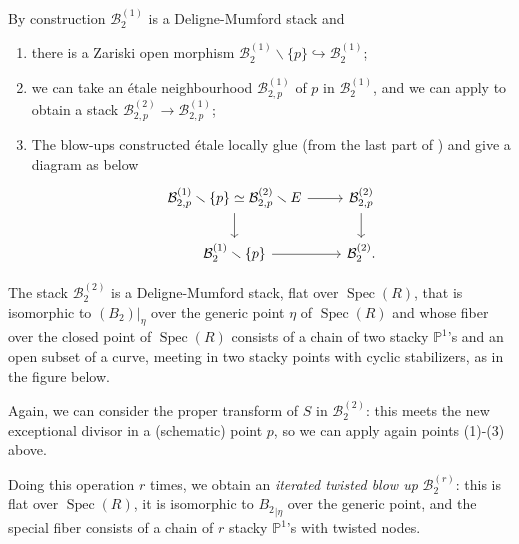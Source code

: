 \documentclass{amsart}
\newcommand{\bP}{\mathbb{P}}
\newcommand{\cB}{\mathcal{B}}
\newcommand{\spec}{\operatorname{Spec}}
\theoremstyle{definition}
\begin{document}
By construction $\cB_2^{(1)}$ is a Deligne-Mumford stack and
\begin{enumerate}
    \item there is a Zariski open morphism $\cB_2^{(1)}\smallsetminus\{p\}\hookrightarrow \cB_2^{(1)}$;
    \item we can take an \'etale neighbourhood $\cB_{2,p}^{(1)}$ of $p$ in $\cB_2^{(1)}$, and we can apply  to obtain a stack $\cB_{2,p}^{(2)}\to\cB_{2,p}^{(1)}$;
    \item The blow-ups constructed \'etale locally glue (from the last part of ) and give a diagram as below
    \[
    \begin{tikzcd}
    \cB^{(1)}_{2,p} \smallsetminus \{p\} \simeq \cB_{2,p}^{(2)}\smallsetminus E \ar[r] \ar[d] & \cB_{2,p}^{(2)} \ar[d] \\
    \cB_2^{(1)}\smallsetminus\{p\} \ar[r] & \cB^{(2)}_2.
    \end{tikzcd}
    \]
\end{enumerate}
The stack $\cB^{(2)}_2$ is a Deligne-Mumford stack, flat over $\spec(R)$, that is isomorphic to $(B_2)|_{\eta}$ over the generic point $\eta$ of $\spec(R)$ and whose fiber over the closed point of $\spec(R)$ consists of a chain of two stacky $\bP^1$'s and an open subset of a curve, meeting in two stacky points with cyclic stabilizers, as in the figure below.

Again, we can consider the proper transform of $S$ in $\cB_2^{(2)}$: this meets the new exceptional divisor in a (schematic) point $p$, so we can apply again points (1)-(3) above.

Doing this operation $r$ times, we obtain an \emph{iterated twisted blow up} $\cB_2^{(r)}$: this is flat over $\spec(R)$, it is isomorphic to ${B_2}_{|\eta}$ over the generic point, and the special fiber consists of a chain of $r$ stacky $\bP^1$'s with twisted nodes.
\end{document}
